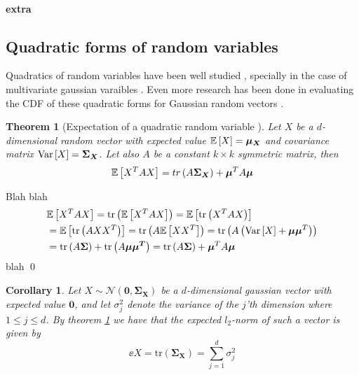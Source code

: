 \documentclass[a4paper,12pt]{article}
\renewenvironment{proof}{{\textit{Proof} \\}}{\qed}
\newtheorem{theorem}{Theorem}
\newtheorem{corollary}{Corollary}[section]
\begin{document}
\paragraph{extra}


\subsection{Quadratic forms of random variables}
Quadratics of random variables have been well studied \cite{BatesQuadForm,MathaiQaudForms}, 
specially in the case of multivariate gaussian varaibles \cite{IowaQuadNormForms,MathaiQaudForms}.
Even more research has been done in evaluating the CDF of these quadratic forms
for Gaussian random vectors \cite{QuadFormsNume,QaudFormsBounds}.

\begin{theorem}[Expectation of a quadratic random variable \cite{BatesQuadForm}]
\label{theo:ExpQuad}
Let $X$ be a $d$-dimensional random vector with expected value $\mathbb{E} \left [ X  \right] =  \bm{\mu_{X}}$
and covariance matrix $\text{Var} \left [ X  \right] = \bm{\Sigma_{X}}$. Let also $A$ be a constant 
$k \times k$ symmetric matrix, then 
\[
    \mathbb{E} \left [ X^T A X  \right] = tr \left (A \bm{\Sigma_X}\right) + \bm{\mu}^T A\bm{\mu}
\]
\end{theorem}

\begin{proof}
Blah blah
\begin{align*}
    &\mathbb{E} \left [ X^T A X  \right] 
    =\text{tr}\left (\mathbb{E} \left [ X^T A X  \right]\right) 
    =\mathbb{E} \left [ \text{tr} \left (X^T A X\right)  \right] \\
    &= \mathbb{E} \left [ \text{tr} \left (A X X^T\right)  \right]
    = \text{tr} \left (A \mathbb{E} \left [ X X^T  \right]\right) 
    = \text{tr} \left (A \left ( \text{Var} \left [ X  \right] + \bm{\mu} \bm{\mu}^T\right)\right) \\
    &= \text{tr} \left (A \bm{\Sigma}\right) + \text{tr} \left (A \bm{\mu \mu^T}\right)
    = \text{tr} \left (A \bm{\Sigma}\right) + \bm{\mu}^T A \bm{\mu}
\end{align*}
blah
\end{proof}
\begin{corollary}
Let $X \sim \mathcal{N}(\bm{0}, \bm{\Sigma_X})$ be a $d$-dimensional gaussian vector
with expected value $\bm{0}$, and let $\sigma_j^2$ denote the variance of the 
$j$'th dimension where $1 \le j \le d$.
By theorem \ref{theo:ExpQuad} we have that the expected $l_2$-norm 
of such a vector is given by
\[
    \ee{X} = \text{tr} (\bm{\Sigma_X}) = \sum_{j=1}^d \sigma_j^2
\]
\end{corollary}
\end{document}
